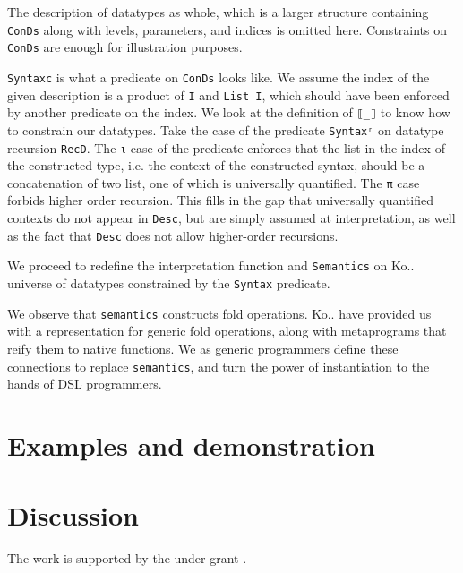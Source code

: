 \documentclass[sigplan,review,fleqn]{acmart}
\begin{document}
The description of datatypes as whole, which is a larger structure containing \verb|ConDs| along with levels, parameters, and indices is omitted here.
Constraints on \verb|ConDs| are enough for illustration purposes.

\verb|Syntaxc| is what a predicate on \verb|ConDs| looks like.
We assume the index of the given description is a product of \verb|I| and \verb|List I|, which should have been enforced by another predicate on the index.
We look at the definition of \verb|⟦_⟧| to know how to constrain our datatypes.
Take the case of the predicate \verb|Syntaxʳ| on datatype recursion \verb|RecD|.
The \verb|ι| case of the predicate enforces that the list in the index of the constructed type, i.e. the context of the constructed syntax, should be a concatenation of two list, one of which is universally quantified.
The \verb|π| case forbids higher order recursion.
This fills in the gap that universally quantified contexts do not appear in \verb|Desc|, but are simply assumed at interpretation, as well as the fact that \verb|Desc| does not allow higher-order recursions.

We proceed to redefine the interpretation function and \verb|Semantics| on Ko.. universe of datatypes constrained by the \verb|Syntax| predicate.

We observe that \verb|semantics| constructs fold operations.
Ko.. have provided us with a representation for generic fold operations, along with metaprograms that reify them to native functions.
We as generic programmers define these connections to replace \verb|semantics|, and turn the power of instantiation to the hands of DSL programmers.


\section{Examples and demonstration}


\section{Discussion}
\begin{acks}
The work is supported by the  under grant .
\end{acks}
\end{document}
